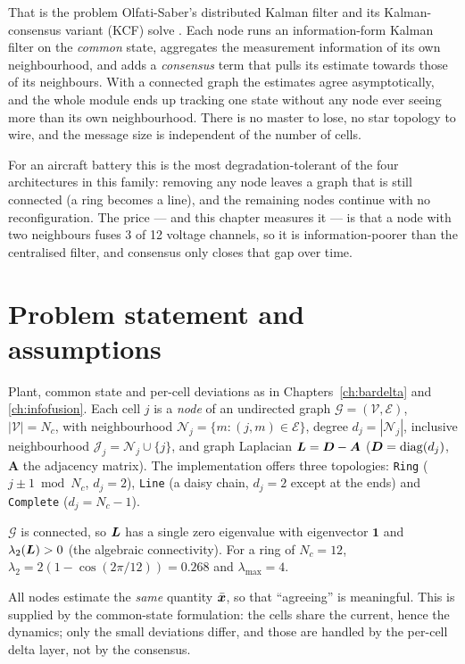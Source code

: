 That is the problem Olfati-Saber's distributed Kalman filter and its Kalman-consensus variant
(KCF) solve \cite{olfatisaber2005embedded,olfatisaber2007dkf,olfatisaber2009kcf}. Each node runs
an information-form Kalman filter on the \emph{common} state, aggregates the measurement
information of its own neighbourhood, and adds a \emph{consensus} term that pulls its estimate
towards those of its neighbours. With a connected graph the estimates agree asymptotically, and
the whole module ends up tracking one state without any node ever seeing more than its own
neighbourhood. There is no master to lose, no star topology to wire, and the message size is
independent of the number of cells.

For an aircraft battery this is the most degradation-tolerant of the four architectures in this
family: removing any node leaves a graph that is still connected (a ring becomes a line), and the
remaining nodes continue with no reconfiguration. The price --- and this chapter measures it --- is
that a node with two neighbours fuses \num{3} of \num{12} voltage channels, so it is
information-poorer than the centralised filter, and consensus only closes that gap over time.

\section{Problem statement and assumptions}
Plant, common state and per-cell deviations as in Chapters~\ref{ch:bardelta} and
\ref{ch:infofusion}. Each cell $j$ is a \emph{node} of an undirected graph
$\mathcal{G}=(\mathcal{V},\mathcal{E})$, $|\mathcal{V}|=N_c$, with neighbourhood
$\mathcal{N}_j=\{m : (j,m)\in\mathcal{E}\}$, degree $d_j=|\mathcal{N}_j|$, inclusive
neighbourhood $\mathcal{J}_j = \mathcal{N}_j\cup\{j\}$, and graph Laplacian
$\bm{L} = \bm{D}-\bm{A}$ ($\bm{D}=\operatorname{diag}(d_j)$, $\bm{A}$ the adjacency matrix). The implementation
offers three topologies: \texttt{Ring} ($j\pm1 \bmod N_c$, $d_j=2$), \texttt{Line} (a
daisy chain, $d_j=2$ except at the ends) and \texttt{Complete} ($d_j=N_c-1$).

\begin{assumption}[Connectivity]\label{as:con-conn}
$\mathcal{G}$ is connected, so $\bm{L}$ has a single zero eigenvalue with eigenvector $\bm{1}$ and
$\lambda_2(\bm{L})>0$ (the algebraic connectivity). For a ring of $N_c=12$,
$\lambda_2 = 2(1-\cos(2\pi/12)) = \num{0.268}$ and $\lambda_{\max}=4$.
\end{assumption}
\begin{assumption}\label{as:con-same}
All nodes estimate the \emph{same} quantity $\bar{\bm{x}}$, so that ``agreeing'' is meaningful. This is
supplied by the common-state formulation: the cells share the current, hence the dynamics; only
the small deviations differ, and those are handled by the per-cell delta layer, not by the
consensus.
\end{assumption}

